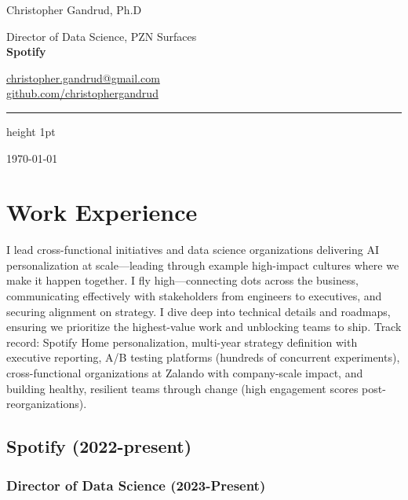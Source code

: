 \documentclass[a4paper]{article}
\begin{document}
\begin{flushright}
    {\huge Christopher Gandrud, Ph.D} \\
    \vspace{0.251cm}

    Director of Data Science, PZN Surfaces \\
    {\bf{\large Spotify}} \\
    \vspace{0.25cm}

    \href{mailto:christopher.gandrud@gmail.com}{christopher.gandrud@gmail.com} \\
    \href{https://github.com/christophergandrud}{github.com/christophergandrud} \\
    \medskip\hrule height 1pt

    \vspace{0.5cm}
    \today
\end{flushright}

\vspace{0.5cm}

\section*{Work Experience}

\noindent I lead cross-functional initiatives and data science organizations delivering AI personalization at scale---leading through example high-impact cultures where we make it happen together. I fly high---connecting dots across the business, communicating effectively with stakeholders from engineers to executives, and securing alignment on strategy. I dive deep into technical details and roadmaps, ensuring we prioritize the highest-value work and unblocking teams to ship. Track record: Spotify Home personalization, multi-year strategy definition with executive reporting, A/B testing platforms (hundreds of concurrent experiments), cross-functional organizations at Zalando with company-scale impact, and building healthy, resilient teams through change (high engagement scores post-reorganizations). 

\subsection*{Spotify (2022-present)}

\subsubsection*{Director of Data Science (2023-Present)}
\end{document}
